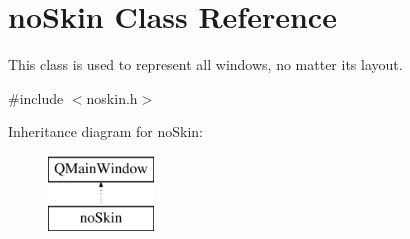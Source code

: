 \hypertarget{classno_skin}{\section{no\-Skin Class Reference}
\label{classno_skin}
}


This class is used to represent all windows, no matter its layout.  




{\ttfamily \#include $<$noskin.\-h$>$}

Inheritance diagram for no\-Skin\-:\begin{figure}[H]
\begin{center}
\leavevmode
\includegraphics[height=2.000000cm]{classno_skin}
\end{center}
\end{figure}
